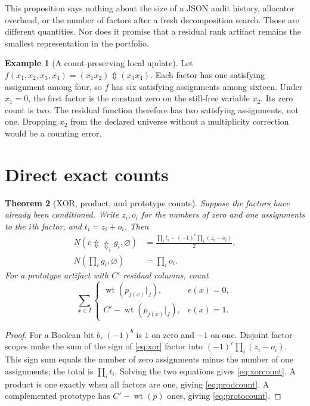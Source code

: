 \documentclass[11pt]{article}
\newcommand{\xor}{\mathbin{\Updownarrow}}
\newcommand{\bigxor}{\mathop{\Updownarrow}}
\newcommand{\wt}{\operatorname{wt}}
\newtheorem{theorem}{Theorem}[section]
\theoremstyle{definition}\newtheorem{definition}[theorem]{Definition}
\newtheorem{example}[theorem]{Example}
\theoremstyle{remark}\newtheorem{remark}[theorem]{Remark}
\begin{document}
This proposition says nothing about the size of a JSON audit history, allocator overhead, or the number of factors after a fresh decomposition search. Those are different quantities. Nor does it promise that a residual rank artifact remains the smallest representation in the portfolio.

\begin{example}[A count-preserving local update]
Let $f(x_1,x_2,x_3,x_4)=(x_1x_2)\xor(x_3x_4)$. Each factor has one satisfying assignment among four, so $f$ has six satisfying assignments among sixteen. Under $x_1=0$, the first factor is the constant zero on the still-free variable $x_2$. Its zero count is two. The residual function therefore has two satisfying assignments, not one. Dropping $x_2$ from the declared universe without a multiplicity correction would be a counting error.
\end{example}

\section{Direct exact counts}
\label{sec:counting}
\begin{theorem}[XOR, product, and prototype counts]
Suppose the factors have already been conditioned. Write $z_i,o_i$ for the numbers of zero and one assignments to the $i$th factor, and $t_i=z_i+o_i$. Then
\begin{align}
 N\left(c\xor\bigxor_i g_i,\varnothing\right)
 &=\frac{\prod_i t_i-(-1)^c\prod_i(z_i-o_i)}{2},\label{eq:xorcount}\\
 N\left(\prod_i g_i,\varnothing\right)&=\prod_i o_i.\label{eq:prodcount}
\end{align}
For a prototype artifact with $C'$ residual columns, count
\begin{equation}
 \sum_{x\in I}\begin{cases}
 \wt(p_{j(x)}|_J),&e(x)=0,\\
 C'-\wt(p_{j(x)}|_J),&e(x)=1.
 \end{cases}\label{eq:protocount}
\end{equation}
\end{theorem}
\begin{proof}
For a Boolean bit $b$, $(-1)^b$ is $1$ on zero and $-1$ on one. Disjoint factor scopes make the sum of the sign of \eqref{eq:xor} factor into $(-1)^c\prod_i(z_i-o_i)$. This sign sum equals the number of zero assignments minus the number of one assignments; the total is $\prod_i t_i$. Solving the two equations gives \eqref{eq:xorcount}. A product is one exactly when all factors are one, giving \eqref{eq:prodcount}. A complemented prototype has $C'-\wt(p)$ ones, giving \eqref{eq:protocount}.
\end{proof}
\end{document}
